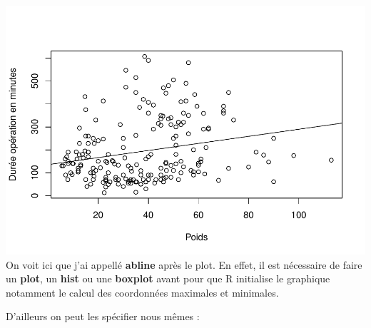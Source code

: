\documentclass[
]{book}
\newenvironment{Shaded}{\begin{snugshade}}{\end{snugshade}}
\newcommand{\AttributeTok}[1]{\textcolor[rgb]{0.13,0.29,0.53}{#1}}
\newcommand{\DecValTok}[1]{\textcolor[rgb]{0.00,0.00,0.81}{#1}}
\newcommand{\FunctionTok}[1]{\textcolor[rgb]{0.13,0.29,0.53}{\textbf{#1}}}
\newcommand{\NormalTok}[1]{#1}
\newcommand{\OtherTok}[1]{\textcolor[rgb]{0.56,0.35,0.01}{#1}}
\newcommand{\SpecialCharTok}[1]{\textcolor[rgb]{0.81,0.36,0.00}{\textbf{#1}}}
\newcommand{\StringTok}[1]{\textcolor[rgb]{0.31,0.60,0.02}{#1}}
\begin{document}
\includegraphics{_main_files/figure-latex/poids10-1.pdf}
On voit ici que j'ai appellé \textbf{abline} après le plot. En effet, il est nécessaire
de faire un \textbf{plot}, un \textbf{hist} ou une \textbf{boxplot} avant pour que R initialise
le graphique notamment le calcul des coordonnées maximales et minimales.

D'ailleurs on peut les spécifier nous mêmes :

\begin{Shaded}
\end{Shaded}
\end{document}
